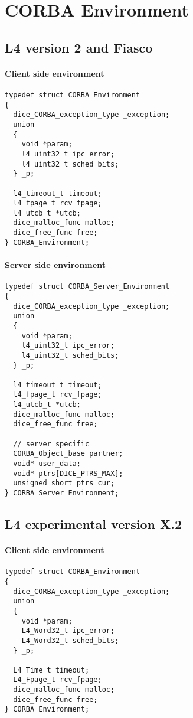 \chapter{CORBA Environment}
\label{app:corba_env}

\section{L4 version 2 and Fiasco}

\subsubsection{Client side environment}
\begin{verbatim}
typedef struct CORBA_Environment
{
  dice_CORBA_exception_type _exception;
  union
  {
    void *param;
    l4_uint32_t ipc_error;
	l4_uint32_t sched_bits;
  } _p;

  l4_timeout_t timeout;
  l4_fpage_t rcv_fpage;
  l4_utcb_t *utcb;
  dice_malloc_func malloc;
  dice_free_func free;
} CORBA_Environment;
\end{verbatim}

\subsubsection{Server side environment}
\begin{verbatim}
typedef struct CORBA_Server_Environment
{
  dice_CORBA_exception_type _exception;
  union
  {
    void *param;
    l4_uint32_t ipc_error;
	l4_uint32_t sched_bits;
  } _p;

  l4_timeout_t timeout;
  l4_fpage_t rcv_fpage;
  l4_utcb_t *utcb;
  dice_malloc_func malloc;
  dice_free_func free;

  // server specific
  CORBA_Object_base partner;
  void* user_data;
  void* ptrs[DICE_PTRS_MAX];
  unsigned short ptrs_cur;
} CORBA_Server_Environment;
\end{verbatim}

\section{L4 experimental version X.2}

\subsubsection{Client side environment}
\begin{verbatim}
typedef struct CORBA_Environment
{
  dice_CORBA_exception_type _exception;
  union
  {
    void *param;
    L4_Word32_t ipc_error;
	L4_Word32_t sched_bits;
  } _p;

  L4_Time_t timeout;
  L4_Fpage_t rcv_fpage;
  dice_malloc_func malloc;
  dice_free_func free;
} CORBA_Environment;
\end{verbatim}

